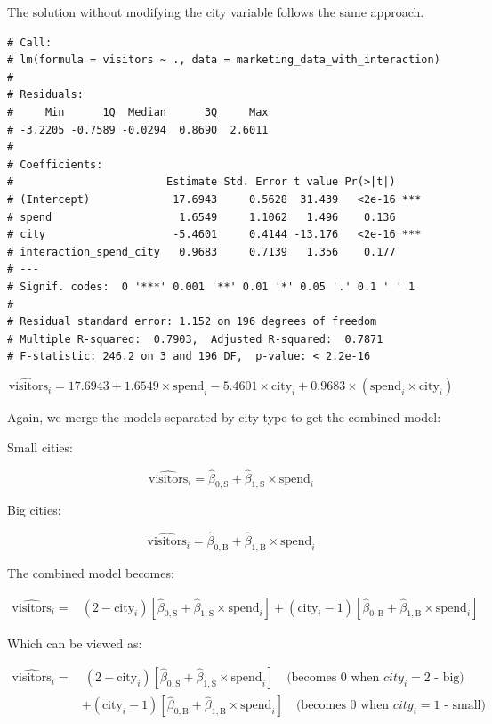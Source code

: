 \documentclass{article}
\begin{document}
The solution without modifying the city variable follows the same approach.

\begin{lstlisting}[style=Rstyle, caption=Combined Model without Modifications in City]
# Call:
# lm(formula = visitors ~ ., data = marketing_data_with_interaction)
# 
# Residuals:
#     Min      1Q  Median      3Q     Max 
# -3.2205 -0.7589 -0.0294  0.8690  2.6011 
# 
# Coefficients:
#                        Estimate Std. Error t value Pr(>|t|)    
# (Intercept)             17.6943     0.5628  31.439   <2e-16 ***
# spend                    1.6549     1.1062   1.496    0.136    
# city                    -5.4601     0.4144 -13.176   <2e-16 ***
# interaction_spend_city   0.9683     0.7139   1.356    0.177    
# ---
# Signif. codes:  0 '***' 0.001 '**' 0.01 '*' 0.05 '.' 0.1 ' ' 1
# 
# Residual standard error: 1.152 on 196 degrees of freedom
# Multiple R-squared:  0.7903,	Adjusted R-squared:  0.7871 
# F-statistic: 246.2 on 3 and 196 DF,  p-value: < 2.2e-16
\end{lstlisting}

\[
\hat{\text{visitors}}_i = 17.6943 + 1.6549 \times \text{spend}_i - 5.4601 \times \text{city}_i + 0.9683 \times (\text{spend}_i \times \text{city}_i)
\]

Again, we merge the models separated by city type to get the combined model:

Small cities:

$$
\hat{\text{visitors}}_i = \hat{\beta}_{0, \text{S}} + \hat{\beta}_{1, \text{S}} \times \text{spend}_i
$$

Big cities:

$$
\hat{\text{visitors}}_i = \hat{\beta}_{0, \text{B}} + \hat{\beta}_{1, \text{B}} \times \text{spend}_i
$$

The combined model becomes:

\begin{align*}
\hat{\text{visitors}}_i
=& (2 - \text{city}_i) \left[\hat{\beta}_{0, \text{S}} + \hat{\beta}_{1, \text{S}} \times \text{spend}_i\right]
+ (\text{city}_i - 1)\left[\hat{\beta}_{0, \text{B}} + \hat{\beta}_{1, \text{B}} \times \text{spend}_i\right]
\end{align*}

Which can be viewed as:

\begin{align*}
\hat{\text{visitors}}_i
=& \ (2 - \text{city}_i) \left[\hat{\beta}_{0, \text{S}} + \hat{\beta}_{1, \text{S}} \times \text{spend}_i\right] \quad \text{(becomes 0 when $city_i = 2$ - big)} \\
&+ (\text{city}_i - 1)\left[\hat{\beta}_{0, \text{B}} + \hat{\beta}_{1, \text{B}} \times \text{spend}_i\right] \quad \text{(becomes 0 when $city_i = 1$ - small)}
\end{align*}
\end{document}
